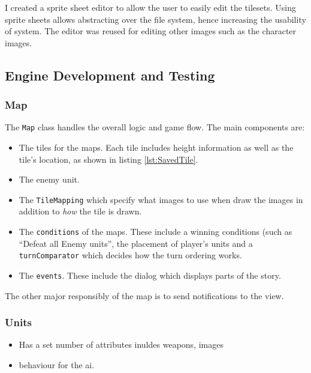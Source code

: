 I created a sprite sheet editor to allow the user to easily edit the tilesets. Using  sprite sheets allows abstracting over the file system, hence increasing the usability of system. The editor was reused for editing other images such as the character images.  

\clearpage
\subsection{Engine Development and Testing}
\label{sub:engine_development_and_testing}
\subsubsection{Map}
\label{ssub:maps}


The \texttt{Map} class handles the overall logic and game flow.   The main components are:
\begin{itemize}
	\item The tiles for the maps. Each tile includes height information as well as the tile's location, as shown in listing \ref{lst:SavedTile}.
	\item The enemy unit.     
	\item The \texttt{TileMapping} which specify what images to use when draw the images in addition to \emph{how} the tile is drawn. 
	\item  The \texttt{conditions} of the maps. These include a winning conditions (such as ``Defeat all Enemy units'',  the placement of player's units and a \texttt{turnComparator} which decides how the turn ordering works.  
	\item  The \texttt{events}. These include the dialog which displays parts of the story. 
\end{itemize}

The other major responsibly of the map is to send notifications to the view.  

\subsubsection{Units}
\label{ssub:units}


\begin{itemize}
	\item Has a set number of attributes inuldes weapons, images
	\item behaviour for the ai.  
\end{itemize}

